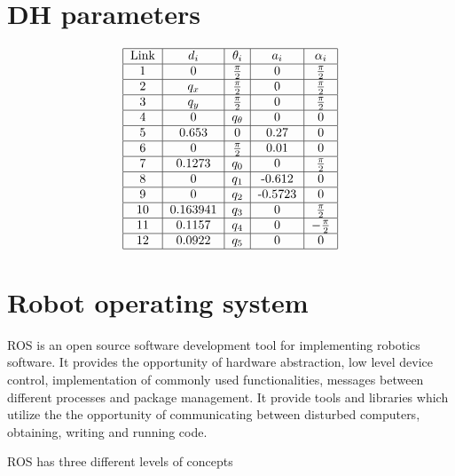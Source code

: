 \documentclass[times, utf8, diplomski, english]{fer}
\begin{document}
\chapter{DH parameters}
\begin{table}
\begin{align}
\label{DH}
 \begin{tabular}{|c|c|c|c|c|}
  \hline
 Link& $d_i$& $\theta_i$& $a_i$ & $\alpha_i$\\
\hline
 1 & $0$ & $\frac{\pi}{2}$ & $0$& $\frac{\pi}{2}$\\
  \hline
 2 & $q_x$ & $\frac{\pi}{2}$ & $0$& $\frac{\pi}{2}$\\
  \hline
 3 & $q_y$ & $\frac{\pi}{2}$ & $0$& $\frac{\pi}{2}$\\
  \hline
 4 & $0$ &$q_{\theta}$ & 0& 0\\
  \hline
 5 & $0.653$ & $0$ & 0.27& 0\\
   \hline
 6 & $0$ & $\frac{\pi}{2}$ & 0.01& 0\\
   \hline
 7 & $0.1273$ & $q_0$ & 0& $\frac{\pi}{2}$\\
   \hline
 8 & $0$ & $q_1$ & -0.612& 0\\
   \hline
 9 & $0$ & $q_2$ & -0.5723& 0\\
  \hline
 10 & $ 0.163941$ & $q_3$ & 0& $\frac{\pi}{2}$\\
  \hline
 11 & $0.1157$ & $q_4$ & 0& $-\frac{\pi}{2}$\\
  \hline
 12 & $0.0922$ & $q_5$ & 0& 0\\
  \hline
 \end{tabular}
\end{align}
\caption{Thing's DH parameters}
\end{table}

\chapter{Robot operating system}\label{sec:def_ROS}
ROS is an open source software development tool for implementing robotics software. It provides the opportunity of hardware abstraction, low level device control, implementation of commonly used functionalities, messages between different processes and package management. It provide tools and libraries which utilize the the opportunity of communicating between disturbed computers, obtaining, writing and running code.


ROS has three different levels of concepts
\end{document}
